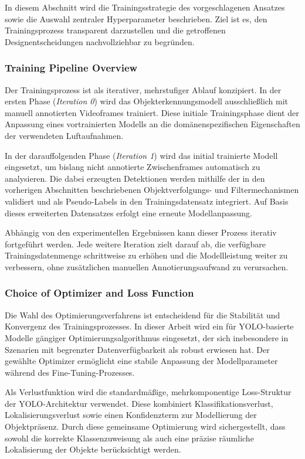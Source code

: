 In diesem Abschnitt wird die Trainingsstrategie des vorgeschlagenen Ansatzes sowie 
die Auswahl zentraler Hyperparameter beschrieben. Ziel ist es, den Trainingsprozess 
transparent darzustellen und die getroffenen Designentscheidungen nachvollziehbar 
zu begründen.

\subsubsection{Training Pipeline Overview}

Der Trainingsprozess ist als iterativer, mehrstufiger Ablauf konzipiert. In der 
ersten Phase (\textit{Iteration 0}) wird das Objekterkennungsmodell ausschließlich 
mit manuell annotierten Videoframes trainiert. Diese initiale Trainingsphase dient 
der Anpassung eines vortrainierten Modells an die domänenspezifischen Eigenschaften 
der verwendeten Luftaufnahmen.

In der darauffolgenden Phase (\textit{Iteration 1}) wird das initial trainierte 
Modell eingesetzt, um bislang nicht annotierte Zwischenframes automatisch zu 
analysieren. Die dabei erzeugten Detektionen werden mithilfe der in den vorherigen 
Abschnitten beschriebenen Objektverfolgungs- und Filtermechanismen validiert und 
als Pseudo-Labels in den Trainingsdatensatz integriert. Auf Basis dieses erweiterten 
Datensatzes erfolgt eine erneute Modellanpassung.

Abhängig von den experimentellen Ergebnissen kann dieser Prozess iterativ 
fortgeführt werden. Jede weitere Iteration zielt darauf ab, die verfügbare 
Trainingsdatenmenge schrittweise zu erhöhen und die Modellleistung weiter zu 
verbessern, ohne zusätzlichen manuellen Annotierungsaufwand zu verursachen.

\subsubsection{Choice of Optimizer and Loss Function}

Die Wahl des Optimierungsverfahrens ist entscheidend für die Stabilität und 
Konvergenz des Trainingsprozesses. In dieser Arbeit wird ein für YOLO-basierte 
Modelle gängiger Optimierungsalgorithmus eingesetzt, der sich insbesondere in 
Szenarien mit begrenzter Datenverfügbarkeit als robust erwiesen hat. Der gewählte 
Optimizer ermöglicht eine stabile Anpassung der Modellparameter während des 
Fine-Tuning-Prozesses.

Als Verlustfunktion wird die standardmäßige, mehrkomponentige Loss-Struktur der 
YOLO-Architektur verwendet. Diese kombiniert Klassifikationsverlust, 
Lokalisierungsverlust sowie einen Konfidenzterm zur Modellierung der 
Objektpräsenz. Durch diese gemeinsame Optimierung wird sichergestellt, dass sowohl 
die korrekte Klassenzuweisung als auch eine präzise räumliche Lokalisierung der 
Objekte berücksichtigt werden.

